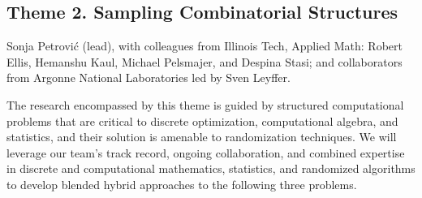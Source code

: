 \documentclass[11pt]{NSFamsart}
\begin{document}

\subsection*{Theme 2. Sampling Combinatorial Structures} 
 Sonja Petrovi\'c (lead),  with colleagues from Illinois Tech, Applied Math: 
 Robert Ellis,
  Hemanshu Kaul, %
 Michael Pelsmajer, %
and  Despina Stasi; %
and collaborators from Argonne National Laboratories led by Sven Leyffer.  

The research encompassed by this theme  is guided by 
structured  computational problems that are critical to discrete optimization, computational algebra, and statistics, and their solution is amenable to randomization techniques. 
We will leverage our team's track record, ongoing collaboration, and  combined expertise in discrete and computational mathematics, statistics, and randomized algorithms to develop  blended hybrid approaches to the following three  problems. 
\end{document}
